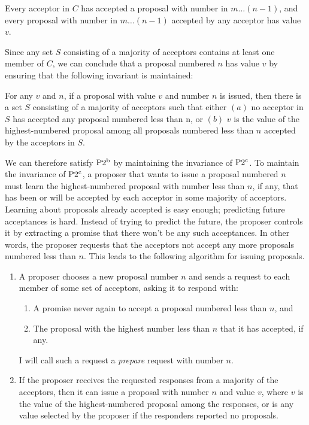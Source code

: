 \begin{paxostheoremenv}
    Every acceptor in $C$ has accepted a proposal with number in $m\ldots(n-1)$, and every proposal with number in $m\ldots(n-1)$ accepted by any acceptor has value $v$.
\end{paxostheoremenv}

Since any set $S$ consisting of a majority of acceptors contains at least one member of $C$, we can conclude that a proposal numbered $n$ has value $v$ by ensuring that the following invariant is maintained:

\begin{paxostheoremenv}[$\PaxosSubtheorem{2}{c}$]
    For any $v$ and $n$, if a proposal with value $v$ and number $n$ is issued, then there is a set $S$ consisting of a majority of acceptors such that either $(a)$ no acceptor in $S$ has accepted any proposal numbered less than n, or $(b)$ $v$ is the value of the highest-numbered proposal among all proposals numbered less than $n$ accepted by the acceptors in $S$.
\end{paxostheoremenv}

We can therefore satisfy $\operatorname{P2^{b}}$ by maintaining the invariance of $\PaxosSubtheorem{2}{c}$.
To maintain the invariance of $\PaxosSubtheorem{2}{c}$, a proposer that wants to issue a proposal numbered $n$ must learn the highest-numbered proposal with number less than $n$, if any, that has been or will be accepted by each acceptor in some majority of acceptors.
Learning about proposals already accepted is easy enough; predicting future acceptances is hard.
Instead of trying to predict the future, the proposer controls it by extracting a promise that there won't be any such acceptances.
In other words, the proposer requests that the acceptors not accept any more proposals numbered less than $n$.
This leads to the following algorithm for issuing proposals.

\begin{enumerate}
    \item A proposer chooses a new proposal number $n$ and sends a request to each member of some set of acceptors, asking it to respond with:
    \begin{enumerate}
        \item A promise never again to accept a proposal numbered less than $n$, and
        \item The proposal with the highest number less than $n$ that it has accepted, if any.
    \end{enumerate}
    I will call such a request a \emph{prepare} request with number $n$.
    \item If the proposer receives the requested responses from a majority of the acceptors, then it can issue a proposal with number $n$ and value $v$, where $v$ is the value of the highest-numbered proposal among the responses, or is any value selected by the proposer if the responders reported no proposals.
\end{enumerate}

